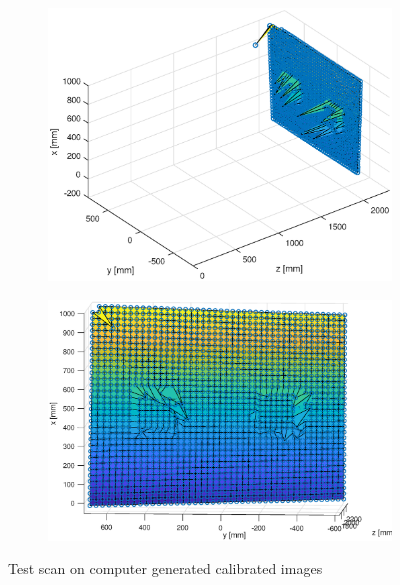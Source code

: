 \begin{figure}[h!]
\begin{subfigure}[t]{0.35\linewidth}
		\label{fig:test3}
	\end{subfigure}
	\begin{subfigure}[t]{0.45\linewidth}
		\centering
		\includegraphics[width=1\linewidth]{figures/part2/test2_scan}
		\label{fig:test4}
	\end{subfigure}
	\begin{subfigure}[t]{0.45\linewidth}
		\centering
		\includegraphics[width=1\linewidth]{figures/part2/test2_scan1}
		\label{fig:test5}
	\end{subfigure}
	\caption{Test scan on computer generated calibrated images}
	\label{fig:test_scan}
 
\end{figure}


